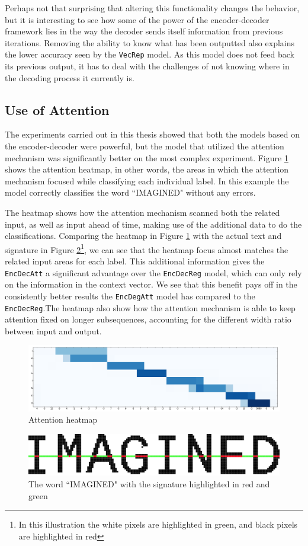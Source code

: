 Perhaps not that surprising that altering this functionality changes the behavior, but it is interesting to see how some of the power of the encoder-decoder framework lies in the way the decoder sends itself information from previous iterations. Removing the ability to know what has been outputted also explains the lower accuracy seen by the {\tt VecRep} model. As this model does not feed back its previous output, it has to deal with the challenges of not knowing where in the decoding process it currently is.

\subsection{Use of Attention}
The experiments carried out in this thesis showed that both the models based on the encoder-decoder were powerful, but the model that utilized the attention mechanism was significantly better on the most complex experiment. Figure \ref{fig:attention_heatmap} shows the attention heatmap, in other words, the areas in which the attention mechanism focused while classifying each individual label. In this example the model correctly classifies the word ``IMAGINED" without any errors. 

The heatmap shows how the attention mechanism scanned both the related input, as well as input ahead of time, making use of the additional data to do the classifications. Comparing the heatmap in Figure \ref{fig:attention_heatmap} with the actual text and signature in Figure  \ref{fig:imagine_highlighted}\footnote{In this illustration the white pixels are highlighted in green, and black pixels are highlighted in red}, we can see that the heatmap focus almost matches the related input areas for each label. This additional information gives the {\tt EncDecAtt} a significant advantage over the {\tt EncDecReg} model, which can only rely on the information in the context vector. We see that this benefit pays off in the consistently better results the {\tt EncDegAtt} model has compared to the {\tt EncDecReg}.The heatmap also show how the attention mechanism is able to keep attention fixed on longer subsequences, accounting for the different width ratio between input and output.

\begin{figure}[ht]
    \centering
    \includegraphics[width=1\textwidth]{fig/conclusion/attention_crop.png}
    \caption{Attention heatmap}
    \label{fig:attention_heatmap}
\end{figure}

\begin{figure}[ht]
    \centering
    \includegraphics[width=1\textwidth]{fig/conclusion/imagined_grid_exported.png}
    \caption{The word ``IMAGINED" with the signature highlighted in red and green}
    \label{fig:imagine_highlighted}
\end{figure}
